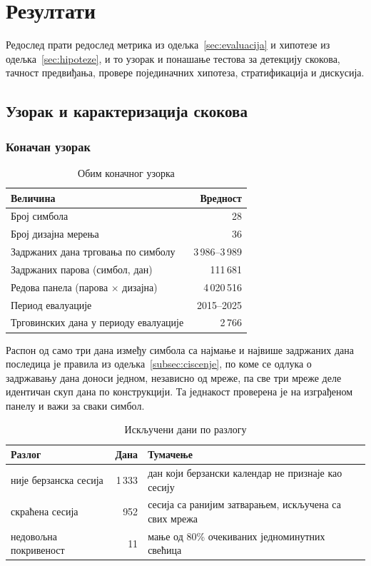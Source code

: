 \chapter{Резултати}
\label{ch:rezultati}

Редослед прати редослед метрика из одељка~\ref{sec:evaluacija} и хипотезе из
одељка~\ref{sec:hipoteze}, и то узорак и понашање тестова за детекцију скокова, тачност
предвиђања, провере појединачних хипотеза, стратификација и дискусија.

\section{Узорак и карактеризација скокова}
\label{sec:rez-uzorak}

\subsection{Коначан узорак}

\begin{table}[htbp]
\centering
\caption{Обим коначног узорка}
\label{tab:uzorak}
\begin{tabular}{lr}
\toprule
Величина & Вредност \\
\midrule
Број симбола                          & 28 \\
Број дизајна мерења                   & 36 \\
Задржаних дана трговања по симболу    & 3\,986–3\,989 \\
Задржаних парова (симбол, дан)        & 111\,681 \\
Редова панела (парова $\times$ дизајна) & 4\,020\,516 \\
Период евалуације                     & 2015–2025 \\
Трговинских дана у периоду евалуације & 2\,766 \\
\bottomrule
\end{tabular}
\end{table}

Распон од само три дана између симбола са најмање и највише задржаних дана последица је
правила из одељка~\ref{subsec:ciscenje}, по коме се одлука о задржавању дана доноси
једном, независно од мреже, па све три мреже деле идентичан скуп дана по конструкцији. Та
једнакост проверена је на изграђеном панелу и важи за сваки симбол.

\begin{table}[htbp]
\centering
\caption{Искључени дани по разлогу}
\label{tab:iskljuceni}
\begin{tabularx}{\textwidth}{L{5.2cm} r X}
\toprule
Разлог & Дана & Тумачење \\
\midrule
није берзанска сесија             & 1\,333 & дан који берзански календар не признаје као сесију \\
скраћена сесија                   & 952    & сесија са ранијим затварањем, искључена са свих мрежа \\
недовољна покривеност             & 11     & мање од 80\% очекиваних једноминутних свећица \\
\bottomrule
\end{tabularx}
\end{table}

